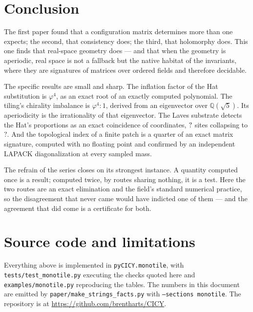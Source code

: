 \documentclass[11pt,a4paper]{article}
\newcommand{\MTSitesHat}{?}\newcommand{\MTSitesOff}{?}
\newcommand{\QQ}{\mathbb{Q}}
\theoremstyle{definition}
\begin{document}

\section{Conclusion}
\label{sec:conclusion}

The first paper found that a configuration matrix determines more than one
expects; the second, that consistency does; the third, that holomorphy
does. This one finds that real-space geometry does --- and that when the
geometry is aperiodic, real space is not a fallback but the native habitat
of the invariants, where they are signatures of matrices over ordered
fields and therefore decidable.

The specific results are small and sharp. The inflation factor of the Hat
substitution is $\varphi^4$, as an exact root of an exactly computed
polynomial. The tiling's chirality imbalance is $\varphi^4 : 1$, derived
from an eigenvector over $\QQ(\sqrt5)$. Its aperiodicity is the
irrationality of that eigenvector. The Laves substrate detects the Hat's
proportions as an exact coincidence of coordinates, $?$
sites collapsing to $\MTSitesHat$. And the topological index of a finite
patch is a quarter of an exact matrix signature, computed with no floating
point and confirmed by an independent LAPACK diagonalization at every
sampled mass.

The refrain of the series closes on its strongest instance. A quantity
computed once is a result; computed twice, by routes sharing nothing, it is
a test. Here the two routes are an exact elimination and the field's
standard numerical practice, so the disagreement that never came would have
indicted one of them --- and the agreement that did come is a certificate
for both.


\section{Source code and limitations}
\label{sec:source}
\footnotesize
Everything above is implemented in \texttt{pyCICY.monotile}, with
\texttt{tests/test\_monotile.py} executing the checks quoted here and
\texttt{examples/monotile.py} reproducing the tables. The numbers in this
document are emitted by \texttt{paper/make\_strings\_facts.py} with
\texttt{--sections monotile}. The repository is at
\url{https://github.com/brentharts/CICY}.
\end{document}
